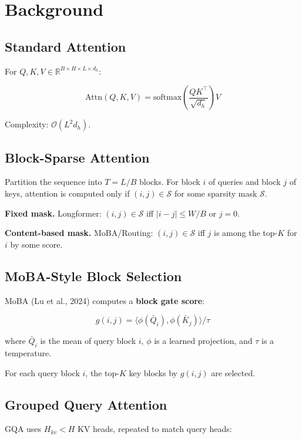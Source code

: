 \section{Background}

\subsection{Standard Attention}

For $Q, K, V \in \mathbb{R}^{B \times H \times L \times d_h}$:

\[
\text{Attn}(Q, K, V) = \text{softmax}\!\left(\frac{Q K^\top}{\sqrt{d_h}}\right) V
\tag{3.1}
\]

Complexity: $\mathcal{O}(L^2 d_h)$.

\subsection{Block-Sparse Attention}

Partition the sequence into $T = L / B$ blocks. For block $i$ of queries 
and block $j$ of keys, attention is computed only if $(i, j) \in \mathcal{S}$ 
for some sparsity mask $\mathcal{S}$.

\textbf{Fixed mask.} Longformer: $(i, j) \in \mathcal{S}$ iff $|i - j| \leq W/B$ 
or $j = 0$.

\textbf{Content-based mask.} MoBA/Routing: $(i, j) \in \mathcal{S}$ iff $j$ 
is among the top-$K$ for $i$ by some score.

\subsection{MoBA-Style Block Selection}

MoBA (Lu et al., 2024) computes a \textbf{block gate score}:

\[
g(i, j) = \langle \phi(\bar{Q}_i), \phi(\bar{K}_j) \rangle / \tau
\tag{3.2}
\]

where $\bar{Q}_i$ is the mean of query block $i$, $\phi$ is a learned 
projection, and $\tau$ is a temperature.

For each query block $i$, the top-$K$ key blocks by $g(i, j)$ are selected.

\subsection{Grouped Query Attention}

GQA uses $H_{kv} < H$ KV heads, repeated to match query heads:

